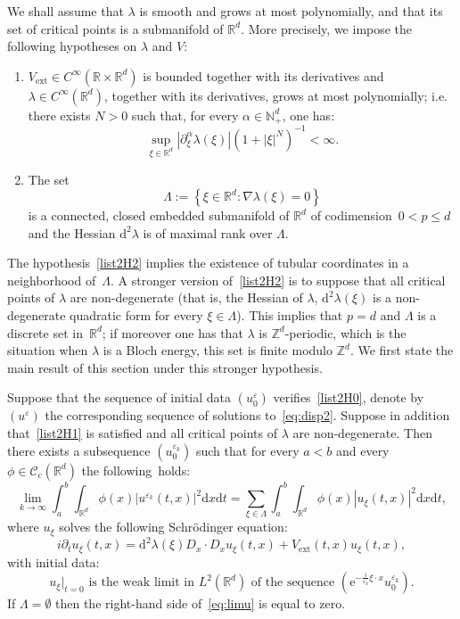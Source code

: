 \documentclass[AHL,Unicode,longabstracts]{cedram}
\DeclareMathOperator{\ext}{ext}
\newcommand*\R{{\mathbb R}}
\newcommand*\N{{\mathbb N}}
\newcommand*\Z{{\mathbb Z}}
\newcommand*\eps{\varepsilon}
\numberwithin{equation}{section}
\newcommand{\ee}{{\mathrm e}}
\newcommand*{\Henumi}{\renewcommand*{\theenumi}{{H\arabic{enumi}}}}
\newcommand*{\dd}{\mathrm{d}}
\newcommand*{\dt}{\dd t}
\newcommand*{\dx}{\dd x}
\begin{document}
We shall assume that $\lambda$ is smooth and grows at most polynomially, and that its set of critical points is a submanifold of $\R^d$. More precisely, we impose the following hypotheses on $\lambda$ and $V$:
\begin{enumerate}\Henumi
\item \label{list2H1} $V_{\ext}\in C^\infty(\R\times\R^d)$ is bounded together with its derivatives and $\lambda\in C^\infty(\R^d)$, together with its derivatives, grows at most polynomially; i.e. there exists $N>0$ such that, for every $\alpha\in\N^d_+$, one has:
\[
\sup_{\xi\in\R^d}\left|\partial_\xi^\alpha\lambda(\xi)\right|(1+|\xi|^N)^{-1}<\infty.
\]
\item \label{list2H2} The set
\[
\Lambda := \left\lbrace \xi \in \R^d : \nabla\lambda(\xi) = 0 \right\rbrace
\]
is a connected, closed embedded submanifold of $\R^d$ of codimension~$0<p\leq d$ and the Hessian $\dd^2\lambda$ is of maximal rank over $\Lambda$.
\end{enumerate}

The hypothesis~\eqref{list2H2} implies the existence of tubular coordinates in a neighborhood of~$\Lambda$. A stronger version of~\eqref{list2H2} is to suppose that all critical points of $\lambda$ are non-degenerate (that is, the Hessian of $\lambda$, $\dd^2\lambda(\xi)$ is a non-degenerate quadratic form for every $\xi\in\Lambda$). This implies that $p=d$ and $\Lambda$ is a discrete set in~$\R^d$; if moreover one has that $\lambda$ is $\Z^d$-periodic, which is the situation when $\lambda$ is a Bloch energy, this set is finite modulo $\Z^d$. We first state the main result of this section under this stronger hypothesis.

\begin{theo}\label{theo:disc}
Suppose that the sequence of initial data $(u^\eps_0)$ verifies~\eqref{list2H0}, denote by~$(u^\eps)$ the corresponding sequence of solutions to~\eqref{eq:disp2}. Suppose in addition that~\eqref{list2H1} is satisfied and all critical points of $\lambda$ are non-degenerate. Then there exists a subsequence $(u^{\eps_k}_0)$ such that for every $a<b$ and every $\phi\in \mathcal{C}_c(\R^d)$ the following~holds:
\begin{equation}\label{eq:limu}
\lim_{k\to\infty}\int_a^b\int_{\R^d}\phi(x)|u^{\eps_k}(t,x)|^2\dx\dt=\sum_{\xi\in \Lambda}\int_a^b\int_{\R^d}\phi(x)|u_\xi (t,x)|^2\dx\dt,
\end{equation}
where $u_\xi$ solves the following Schr\"odinger equation:
\begin{equation}\label{eq:schrohprofil}
i\partial_t u_\xi(t,x) =\dd^2\lambda(\xi)D_x\cdot D_x u_\xi(t,x) +V_{\ext}(t,x)u_\xi(t,x),
\end{equation}
with initial data:
\[
u_\xi|_{t=0} \text{ is the weak limit in } L^2(\R^d) \text{ of the sequence } \left({\ee}^{-\frac{i}{\eps_k} \xi \cdot x} u^{\eps_k}_0\right).
\]
If $\Lambda=\emptyset$ then the right-hand side of~\eqref{eq:limu} is equal to zero.
\end{theo}
\end{document}

